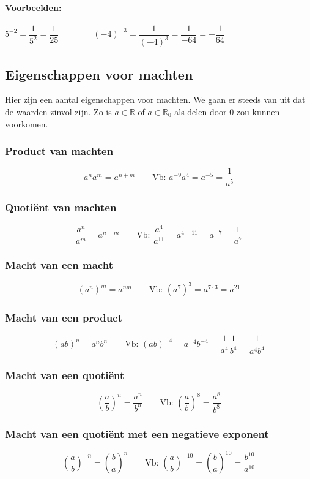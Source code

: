\documentclass[12pt,twoside]{article}
\begin{document}
\paragraph*{Voorbeelden:}
$5^{-2}=\dfrac{1}{5^2} = \dfrac{1}{25} \qquad \qquad (-4)^{-3} = \dfrac{1}{(-4)^3} = \dfrac{1}{-64}=-\dfrac{1}{64}$

\subsection{Eigenschappen voor machten}

Hier zijn een aantal eigenschappen voor machten. We gaan er steeds van uit dat de waarden zinvol zijn. Zo is $a\in\mathbb{R}$ of $a\in\mathbb{R}_0$ als delen door 0 zou kunnen voorkomen.

\subsubsection*{Product van machten}
$$a^n a^m = a^{n+m} \qquad \text{Vb: } a^{-9}a^4 = a^{-5}=\dfrac{1}{a^5}$$

\subsubsection*{Quotiënt van machten}
$$\dfrac{a^n}{a^m} = a^{n-m} \qquad \text{Vb: } \dfrac{a^4}{a^{11}}=a^{4-11}=a^{-7}=\dfrac{1}{a^7}$$

\subsubsection*{Macht van een macht}
$$\left(a^n\right)^m = a^{nm}\qquad \text{Vb: } \left(a^7\right)^3=a^{7\cdot 3}=a^{21}$$

\subsubsection*{Macht van een product}
$$\left(ab\right)^n = a^nb^n \qquad \text{Vb: } \left(ab\right)^{-4}=a^{-4}b^{-4}=\dfrac{1}{a^4}\dfrac{1}{b^4}=\dfrac{1}{a^4b^4}$$

\subsubsection*{Macht van een quotiënt}
$$\left(\dfrac{a}{b}\right)^n = \dfrac{a^n}{b^n} \qquad \text{Vb: } \left(\dfrac{a}{b}\right)^8 = \dfrac{a^8}{b^8}$$

\subsubsection*{Macht van een quotiënt met een negatieve exponent}
$$\left(\dfrac{a}{b}\right)^{-n} = \left(\dfrac{b}{a}\right)^{n} \qquad \text{Vb: } \left(\dfrac{a}{b}\right)^{-10} = \left(\dfrac{b}{a}\right)^{10} = \dfrac{b^{10}}{a^{10}}$$
\end{document}
